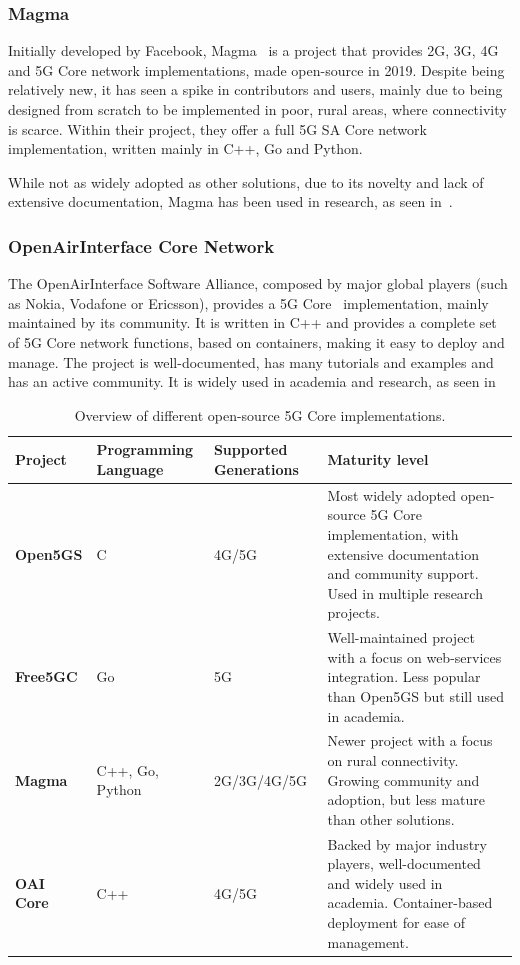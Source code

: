 \subsubsection{Magma}
\label{sec:magma}
Initially developed by Facebook, Magma~\cite{magma_repo} is a project that provides 2G, 3G, 4G and 5G Core network implementations, made open-source in 2019. Despite being relatively new, it has seen a spike in contributors and users, mainly due to being designed from scratch to be implemented in poor, rural areas, where connectivity is scarce. Within their project, they offer a full 5G \gls{SA} Core network implementation, written mainly in C++, Go and Python.

While not as widely adopted as other solutions, due to its novelty and lack of extensive documentation, Magma has been used in research, as seen in~\cite{hasan2023building}.
\subsubsection{OpenAirInterface Core Network}
\label{sec:openairinterface}

The OpenAirInterface Software Alliance, composed by major global players (such as Nokia, Vodafone or Ericsson), provides a 5G Core~\cite{oai_core_repo} implementation, mainly maintained by its community. It is written in C++  and provides a complete set of 5G Core network functions, based on containers, making it easy to deploy and manage. The project is well-documented, has many tutorials and examples and has an active community. It is widely used in academia and research, as seen in \cites{bonati2025_5gct}{horstmann2025open5gcube}{vazquez2024maq5g}


\begin{table}[htbp]
\centering
\footnotesize
\begin{tabularx}{\textwidth}{|l|p{2.2cm}|p{2.1cm}|p{7.5cm}|}
\hline
\rowcolor{gray!30} 
\textbf{Project} & \textbf{Programming Language} & \textbf{Supported Generations} & \textbf{Maturity level}\\ \hline
\textbf{Open5GS} & C & 4G/5G & Most widely adopted open-source 5G Core implementation, with extensive documentation and community support. Used in multiple research projects. \\ \hline
\textbf{Free5GC} & Go & 5G & Well-maintained project with a focus on web-services integration. Less popular than Open5GS but still used in academia.\\ \hline
\textbf{Magma} & C++, Go, Python & 2G/3G/4G/5G & Newer project with a focus on rural connectivity. Growing community and adoption, but less mature than other solutions.\\ \hline
\textbf{\gls{OAI} Core} & C++ & 4G/5G & Backed by major industry players, well-documented and widely used in academia. Container-based deployment for ease of management.\\ \hline
\end{tabularx}
\caption{Overview of different open-source 5G Core implementations.}
\label{tab:5gcore_implementations}
\end{table}


